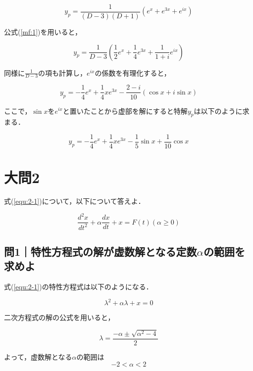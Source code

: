 \documentclass[a4paper,11pt]{bxjsarticle}
\begin{document}
\begin{equation}
  y_p = \frac{1}{(D - 3)(D + 1)}(e^x + e^{3x} + e^{ix})
\end{equation}

公式(\ref{mf:1})を用いると，

\begin{equation}
  y_p = \frac{1}{D - 3}(\frac{1}{2}e^x + \frac{1}{4}e^{3x} + \frac{1}{1+i}e^{ix})
\end{equation}

同様に$\frac{1}{D-3}$の項も計算し，$e^{ix}$の係数を有理化すると，

\begin{equation}
  y_p = -\frac{1}{4}e^x + \frac{1}{4}xe^{3x} - \frac{2 - i}{10}(\cos x + i\sin x)
\end{equation}

ここで，$\sin x$を$e^{ix}$と置いたことから虚部を解にすると特解$y_p$は以下のように求まる．

\begin{equation}
  y_p = -\frac{1}{4}e^x + \frac{1}{4}xe^{3x} - \frac{1}{5}\sin x + \frac{1}{10}\cos x
\end{equation}

\section{大問2}
式(\ref{equ:2-1})について，以下について答えよ．

\begin{equation}
  \frac{d^2x}{dt^2}+\alpha \frac{dx}{dt}+x=F(t)　(\alpha \geq 0)
  \label{equ:2-1}
\end{equation}

\subsection{問1｜特性方程式の解が虚数解となる定数$\alpha$の範囲を求めよ}
式(\ref{equ:2-1})の特性方程式は以下のようになる．

\begin{equation}
  \lambda^2 + \alpha \lambda + x = 0
\end{equation}

二次方程式の解の公式を用いると，

\begin{equation}
 \lambda = \frac{-\alpha \pm \sqrt{\alpha^2 - 4}}{2}
 \label{equ:2-2}
\end{equation}

よって，虚数解となる$\alpha$の範囲は
\begin{equation}
  -2 < \alpha < 2
\end{equation}
\end{document}
